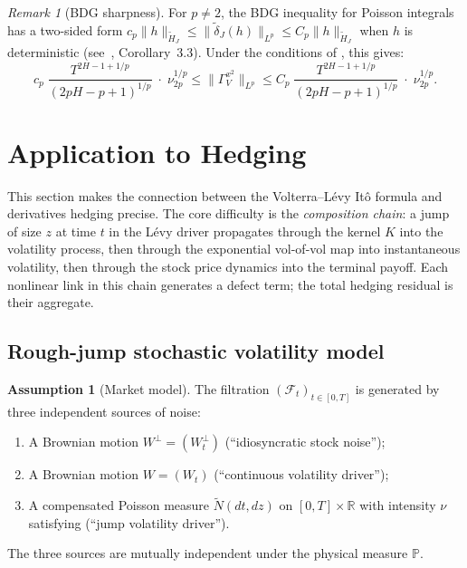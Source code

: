 \documentclass[11pt,a4paper]{article}
\theoremstyle{plain}
\theoremstyle{definition}
\newtheorem{assumption}[theorem]{Assumption}
\theoremstyle{remark}
\newtheorem{remark}[theorem]{Remark}
\newcommand{\R}{\mathbb{R}}
\newcommand{\PP}{\mathbb{P}}
\newcommand{\F}{\mathcal{F}}
\newcommand{\Ntilde}{\widetilde{N}}
\begin{document}
\begin{remark}[BDG sharpness]\label{rem:BDG-sharp}
For $p \neq 2$, the BDG inequality
for Poisson integrals has a two-sided form
$c_p\|h\|_{\widetilde{H}_J} \leq
\|\widetilde{\delta}_J(h)\|_{L^p} \leq
C_p\|h\|_{\widetilde{H}_J}$ when $h$ is deterministic
(see~\cite{Dirksen2015}, Corollary~3.3).  Under the
conditions of , this gives:
\begin{equation}\label{eq:two-sided}
  c_p\;\frac{T^{2H - 1 + 1/p}}{(2pH-p+1)^{1/p}}
  \;\cdot\;\nu_{2p}^{1/p}
  \leq \|\Gamma_V^{x^2}\|_{L^p}
  \leq C_p\;\frac{T^{2H - 1 + 1/p}}{(2pH-p+1)^{1/p}}
  \;\cdot\;\nu_{2p}^{1/p}.
\end{equation}
\end{remark}


\section{Application to Hedging}\label{sec:hedging}

This section makes the connection between the Volterra--L\'evy
It\^o formula and derivatives hedging precise.  The core
difficulty is the \emph{composition chain}: a jump of size $z$ at
time $t$ in the L\'evy driver propagates through the kernel $K$
into the volatility process, then through the exponential
vol-of-vol map into instantaneous volatility, then through the
stock price dynamics into the terminal payoff.  Each nonlinear
link in this chain generates a defect term; the total hedging
residual is their aggregate.


\subsection{Rough-jump stochastic volatility model}

\begin{assumption}[Market model]\label{ass:market}
The filtration $(\F_t)_{t \in [0,T]}$ is generated by three
independent sources of noise:
\begin{enumerate}[label=(N\arabic*)]
\item\label{N1} A Brownian motion $W^\perp = (W_t^\perp)$
  (``idiosyncratic stock noise'');
\item\label{N2} A Brownian motion $W = (W_t)$
  (``continuous volatility driver'');
\item\label{N3} A compensated Poisson measure
  $\Ntilde(dt,dz)$ on $[0,T] \times \R$ with intensity
  $\nu$ satisfying 
  (``jump volatility driver'').
\end{enumerate}
The three sources are mutually independent under the physical
measure $\PP$.
\end{assumption}
\end{document}
